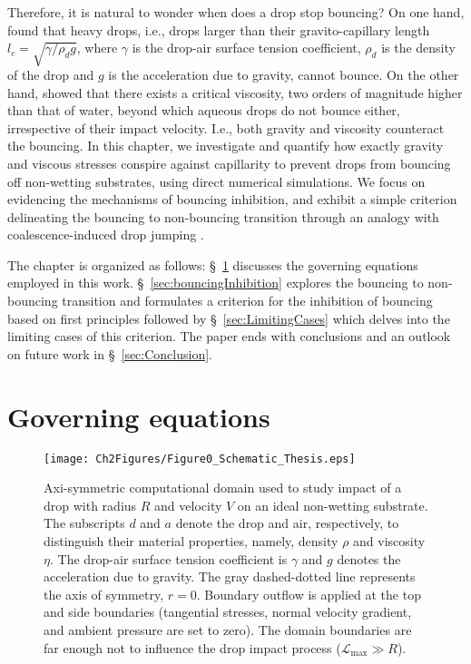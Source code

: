 Therefore, it is natural to wonder when does a drop stop bouncing? On one hand, \citet{biance2006} found that heavy drops, i.e., drops larger than their gravito-capillary length $l_c = \sqrt{\gamma/\rho_dg}$, where $\gamma$ is the drop-air surface tension coefficient, $\rho_d$ is the density of the drop and $g$ is the acceleration due to gravity, cannot bounce.
On the other hand, \citet{jha2020viscous} showed that there exists a critical viscosity, two orders of magnitude higher than that of water, beyond which aqueous drops do not bounce either, irrespective of their impact velocity. I.e., both gravity and viscosity counteract the bouncing. In this chapter, we investigate and quantify how exactly gravity and viscous stresses conspire against capillarity to prevent drops from bouncing off non-wetting substrates, using direct numerical simulations. We focus on evidencing the mechanisms of bouncing inhibition, and exhibit a simple criterion delineating the bouncing to non-bouncing transition through an analogy with coalescence-induced drop jumping \citep{boreyko2009, mouterde2017merging, lecointre2019ballistics}.

The chapter is organized as follows: \S~\ref{sec:method} discusses the governing equations employed in this work. \S~\ref{sec:bouncingInhibition} explores the bouncing to non-bouncing transition and formulates a criterion for the inhibition of bouncing based on first principles followed by \S~\ref{sec:LimitingCases} which delves into the limiting cases of this criterion. The paper ends with conclusions and an outlook on future work in \S~\ref{sec:Conclusion}.  

\section{Governing equations}
\label{sec:method}
\begin{figure}
	\centering
	\texttt{[image: Ch2Figures/Figure0\_Schematic\_Thesis.eps]}
	\caption{Axi-symmetric computational domain used to study impact of a drop with radius $R$ and velocity $V$ on an ideal non-wetting substrate. The subscripts $d$ and $a$ denote the drop and air, respectively, to distinguish their material properties, namely, density $\rho$ and viscosity $\eta$. The drop-air surface tension coefficient is $\gamma$ and $g$ denotes the acceleration due to gravity. The gray dashed-dotted line represents the axis of symmetry, $r = 0$. Boundary outflow is applied at the top and side boundaries (tangential stresses, normal velocity gradient, and ambient pressure are set to zero). The domain boundaries are far enough not to influence the drop impact process ($\mathcal{L}_{\text{max}} \gg R$).}
	\label{Ch3::fig:schematic}
\end{figure}

